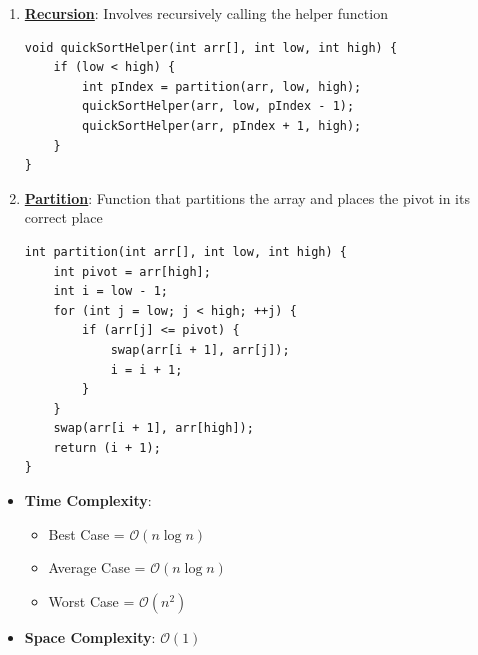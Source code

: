 \documentclass[a4paper, 12pt]{book}
\newcommand{\BigO}[1]{\mathcal{O}\left(#1\right)}
\begin{document}
	\begin{enumerate}
		\item \textbf{\underline{Recursion}}: Involves recursively calling the helper function
	
	\begin{tcolorbox}
	\begin{Verbatim}
void quickSortHelper(int arr[], int low, int high) {
	if (low < high) {
		int pIndex = partition(arr, low, high);
		quickSortHelper(arr, low, pIndex - 1);
		quickSortHelper(arr, pIndex + 1, high);
	}
}
	\end{Verbatim}
	\end{tcolorbox}
	
	\vspace{\baselineskip} 
	
	\item \textbf{\underline{Partition}}: Function that partitions the array and places the pivot in its correct place
	\begin{tcolorbox}
		\begin{Verbatim}
int partition(int arr[], int low, int high) {
	int pivot = arr[high];
	int i = low - 1;
	for (int j = low; j < high; ++j) {
		if (arr[j] <= pivot) {
			swap(arr[i + 1], arr[j]);
			i = i + 1;
		}
	}
	swap(arr[i + 1], arr[high]);
	return (i + 1);
}
		\end{Verbatim}
	\end{tcolorbox}
	\vspace{\baselineskip} 
\end{enumerate}


\begin{itemize}
	\item \textbf{Time Complexity}:
	\begin{itemize}
	
		\item Best Case = $\BigO{n \log n}$ 
		
		\item Average Case = $\BigO{n \log n}$ 
		
		\item Worst Case = $\BigO{n^2}$
	\end{itemize}
		
	\item \textbf{Space Complexity}: $\BigO{1}$ 
\end{itemize}
	
\end{document}
